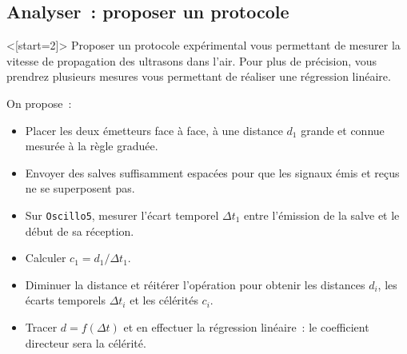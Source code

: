 \documentclass[../main/main.tex]{subfiles}
\begin{document}
\subsection{Analyser~: proposer un protocole}


\QR<[start=2]>{%
	Proposer un protocole expérimental vous permettant de mesurer la
	vitesse de propagation des ultrasons dans l'air. Pour plus de précision,
	vous prendrez plusieurs mesures vous permettant de réaliser une
	régression linéaire.
}{%
	On propose~:
	\begin{itemize}
		\item Placer les deux émetteurs face à face, à une distance $d_1$ grande et
		      connue mesurée à la règle graduée.
		\item Envoyer des salves suffisamment espacées pour que les signaux émis et
		      reçus ne se superposent pas.
		\item Sur \texttt{Oscillo5}, mesurer l'écart temporel $\Delta{t_1}$ entre
		      l'émission de la salve et le début de sa réception.
		\item Calculer $c_1 = d_1/\Delta{t_1}$.
		\item Diminuer la distance et réitérer l'opération pour obtenir les
		      distances $d_i$, les écarts temporels $\Delta{t_i}$ et les célérités
		      $c_i$.
		\item Tracer $d = f(\Delta{t})$ et en effectuer la régression linéaire~: le
		      coefficient directeur sera la célérité.
	\end{itemize}
}

\end{document}

